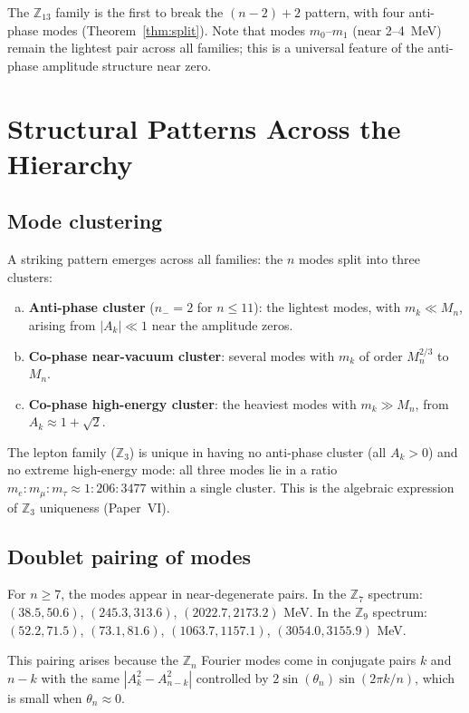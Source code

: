 \documentclass[11pt]{article}
\begin{document}
The $\mathbb{Z}_{13}$ family is the first to break the $(n-2)+2$ pattern,
with four anti-phase modes (Theorem~\ref{thm:split}).
Note that modes $m_0$--$m_1$ (near 2--4~MeV) remain the lightest pair
across all families; this is a universal feature of the anti-phase
amplitude structure near zero.


\section{Structural Patterns Across the Hierarchy}
\label{sec:patterns}

\subsection{Mode clustering}

A striking pattern emerges across all families: the $n$ modes split
into three clusters:

\begin{enumerate}[(a)]
  \item \textbf{Anti-phase cluster} ($n_- = 2$ for $n \leq 11$):
    the lightest modes, with $m_k \ll M_n$, arising from
    $|A_k| \ll 1$ near the amplitude zeros.
  \item \textbf{Co-phase near-vacuum cluster}:
    several modes with $m_k$ of order $M_n^{2/3}$ to $M_n$.
  \item \textbf{Co-phase high-energy cluster}:
    the heaviest modes with $m_k \gg M_n$, from $A_k \approx 1+\sqrt{2}$.
\end{enumerate}

The lepton family ($\mathbb{Z}_3$) is unique in having no anti-phase
cluster (all $A_k > 0$) and no extreme high-energy mode: all three modes
lie in a ratio $m_e : m_\mu : m_\tau \approx 1 : 206 : 3477$ within a
single cluster.
This is the algebraic expression of $\mathbb{Z}_3$ uniqueness (Paper~VI).

\subsection{Doublet pairing of modes}

For $n \geq 7$, the modes appear in near-degenerate pairs.
In the $\mathbb{Z}_7$ spectrum: $(38.5, 50.6)$, $(245.3, 313.6)$,
$(2022.7, 2173.2)$ MeV.
In the $\mathbb{Z}_9$ spectrum: $(52.2, 71.5)$, $(73.1, 81.6)$,
$(1063.7, 1157.1)$, $(3054.0, 3155.9)$ MeV.

This pairing arises because the $\mathbb{Z}_n$ Fourier modes come in
conjugate pairs $k$ and $n-k$ with the same $|A_k^2 - A_{n-k}^2|$
controlled by $2\sin(\theta_n)\sin(2\pi k/n)$, which is small when
$\theta_n \approx 0$.
\end{document}
